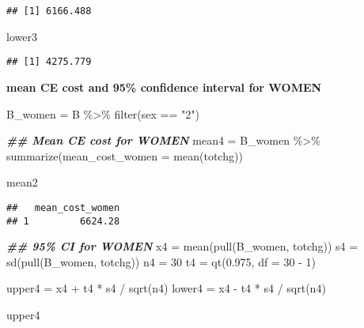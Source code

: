 \documentclass[
]{article}
\newenvironment{Shaded}{\begin{snugshade}}{\end{snugshade}}
\newcommand{\AttributeTok}[1]{\textcolor[rgb]{0.77,0.63,0.00}{#1}}
\newcommand{\DecValTok}[1]{\textcolor[rgb]{0.00,0.00,0.81}{#1}}
\newcommand{\DocumentationTok}[1]{\textcolor[rgb]{0.56,0.35,0.01}{\textbf{\textit{#1}}}}
\newcommand{\FloatTok}[1]{\textcolor[rgb]{0.00,0.00,0.81}{#1}}
\newcommand{\FunctionTok}[1]{\textcolor[rgb]{0.00,0.00,0.00}{#1}}
\newcommand{\NormalTok}[1]{#1}
\newcommand{\OtherTok}[1]{\textcolor[rgb]{0.56,0.35,0.01}{#1}}
\newcommand{\SpecialCharTok}[1]{\textcolor[rgb]{0.00,0.00,0.00}{#1}}
\newcommand{\StringTok}[1]{\textcolor[rgb]{0.31,0.60,0.02}{#1}}
\begin{document}
\begin{verbatim}
## [1] 6166.488
\end{verbatim}

\begin{Shaded}
\begin{Highlighting}[]
\NormalTok{lower3}
\end{Highlighting}
\end{Shaded}

\begin{verbatim}
## [1] 4275.779
\end{verbatim}

\textbf{mean CE cost and 95\% confidence interval for WOMEN}

\begin{Shaded}
\begin{Highlighting}[]
\NormalTok{B\_women }\OtherTok{=} 
\NormalTok{B }\SpecialCharTok{\%\textgreater{}\%} 
  \FunctionTok{filter}\NormalTok{(sex }\SpecialCharTok{==} \StringTok{"2"}\NormalTok{)}

\DocumentationTok{\#\# Mean CE cost for WOMEN}
\NormalTok{mean4 }\OtherTok{=} 
\NormalTok{B\_women }\SpecialCharTok{\%\textgreater{}\%} 
  \FunctionTok{summarize}\NormalTok{(}\AttributeTok{mean\_cost\_women =} \FunctionTok{mean}\NormalTok{(totchg)) }

\NormalTok{mean2}
\end{Highlighting}
\end{Shaded}

\begin{verbatim}
##   mean_cost_women
## 1         6624.28
\end{verbatim}

\begin{Shaded}
\begin{Highlighting}[]
\DocumentationTok{\#\# 95\% CI for WOMEN}
\NormalTok{x4 }\OtherTok{=} \FunctionTok{mean}\NormalTok{(}\FunctionTok{pull}\NormalTok{(B\_women, totchg))}
\NormalTok{s4 }\OtherTok{=} \FunctionTok{sd}\NormalTok{(}\FunctionTok{pull}\NormalTok{(B\_women, totchg))}
\NormalTok{n4 }\OtherTok{=} \DecValTok{30}
\NormalTok{t4 }\OtherTok{=} \FunctionTok{qt}\NormalTok{(}\FloatTok{0.975}\NormalTok{, }\AttributeTok{df =} \DecValTok{30} \SpecialCharTok{{-}} \DecValTok{1}\NormalTok{)}

\NormalTok{upper4 }\OtherTok{=}\NormalTok{ x4 }\SpecialCharTok{+}\NormalTok{ t4 }\SpecialCharTok{*}\NormalTok{ s4 }\SpecialCharTok{/} \FunctionTok{sqrt}\NormalTok{(n4)}
\NormalTok{lower4 }\OtherTok{=}\NormalTok{ x4 }\SpecialCharTok{{-}}\NormalTok{ t4 }\SpecialCharTok{*}\NormalTok{ s4 }\SpecialCharTok{/} \FunctionTok{sqrt}\NormalTok{(n4)}

\NormalTok{upper4}
\end{Highlighting}
\end{Shaded}
\end{document}
